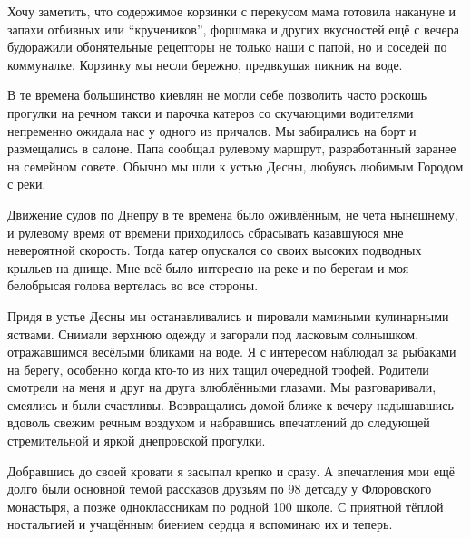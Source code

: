 Хочу заметить, что содержимое корзинки с перекусом мама готовила накануне и
запахи отбивных или \enquote{кручеников}, форшмака и других вкусностей ещё с
вечера будоражили обонятельные рецепторы не только наши с папой, но и соседей
по коммуналке. Корзинку мы несли бережно, предвкушая пикник на воде. 

В те времена большинство киевлян не могли себе позволить часто роскошь прогулки
на речном такси и парочка катеров со скучающими водителями непременно ожидала
нас у одного из причалов. Мы забирались на борт и размещались в салоне. Папа
сообщал рулевому маршрут, разработанный заранее на семейном совете. Обычно мы
шли к устью Десны, любуясь любимым Городом с реки.

Движение судов по Днепру в те времена было оживлённым, не чета нынешнему, и
рулевому время от времени приходилось сбрасывать казавшуюся мне невероятной
скорость. Тогда катер опускался со своих высоких подводных крыльев на днище.
Мне всё было интересно на реке и по берегам и моя белобрысая голова вертелась
во все стороны. 

Придя в устье Десны мы останавливались и пировали мамиными кулинарными яствами.
Снимали верхнюю одежду и загорали под ласковым солнышком, отражавшимся весёлыми
бликами на воде. Я с интересом наблюдал за рыбаками на берегу, особенно когда
кто-то из них тащил очередной трофей. Родители смотрели на меня и друг на друга
влюблёнными глазами. Мы разговаривали, смеялись и были счастливы. Возвращались
домой ближе к вечеру надышавшись вдоволь свежим речным воздухом и набравшись
впечатлений до следующей стремительной и яркой днепровской прогулки. 

Добравшись до своей кровати я засыпал крепко и сразу. А впечатления мои ещё
долго были основной темой рассказов друзьям по 98 детсаду у Флоровского
монастыря, а позже одноклассникам по родной 100 школе. С приятной тёплой
ностальгией и учащённым биением сердца я вспоминаю их и теперь.
